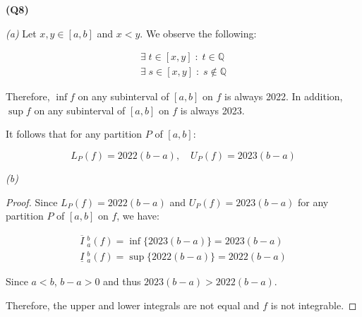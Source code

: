 \documentclass[12pt, a4paper]{article}
\newcommand{\Q}{\mathbb{Q}}
\newcommand{\st}{\; \colon \;}
\newcommand{\lsum}[2]{L_{#1}(#2)}
\newcommand{\usum}[2]{U_{#1}(#2)}
\begin{document}
\textbf{(Q8)}

\textit{(a)}
Let $x, y \in [a, b]$ and $x < y$.
We observe the following:

\begin{gather*}
    \exists \;t \in [x, y] \st t \in \Q\\
    \exists \;s \in [x, y] \st s \notin \Q
\end{gather*}

Therefore, $\inf{f}$ on any subinterval of $[a, b]$ on $f$ is always 2022.
In addition, $\sup{f}$ on any subinterval of $[a, b]$ on $f$ is always 2023.

It follows that for any partition $P$ of $[a,b]$:

\[
    \lsum{P}{f} = 2022(b - a), \quad \usum{P}{f} = 2023(b - a)
\]

\textit{(b)}

\begin{proof}
    Since $\lsum{P}{f} = 2022(b - a)$ and $\usum{P}{f} = 2023(b - a)$ for
    any partition $P$ of $[a, b]$ on $f$, we have:

    \begin{gather*}
        \overline{I}\;^{b}_{a} (f) = \inf\{ 2023(b - a) \} = 2023(b - a)\\
        \underline{I}\;^{b}_{a} (f) = \sup\{ 2022(b - a) \} = 2022(b - a)
    \end{gather*}

    Since $a < b$, $b - a > 0$ and thus $2023(b - a) > 2022(b - a)$.

    Therefore, the upper and lower integrals are not equal and $f$ is not
    integrable.
\end{proof}
\end{document}
